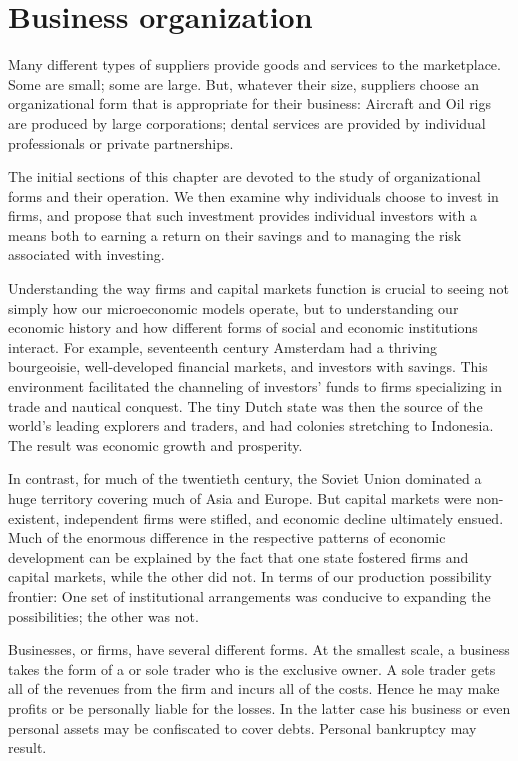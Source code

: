 \section{Business organization}\label{sec:ch7sec1}

Many different types of suppliers provide goods and services to the marketplace. Some are small; some are large. But, whatever their size, suppliers choose an organizational form that is appropriate for their business: Aircraft and Oil rigs are produced by large corporations; dental services are provided by individual professionals or private partnerships.

The initial sections of this chapter are devoted to the study of organizational forms and their operation. We then examine why individuals choose to invest in firms, and propose that such investment provides individual investors with a means both to earning a return on their savings and to managing the risk associated with investing.

Understanding the way firms and capital markets function is crucial to seeing not simply how our microeconomic models operate, but to understanding our economic history and how different forms of social and economic institutions interact. For example, seventeenth century Amsterdam had a thriving bourgeoisie, well-developed financial markets, and investors with savings. This environment facilitated the channeling of investors' funds to firms specializing in trade and nautical conquest. The tiny Dutch state was then the source of the world's leading explorers and traders, and had colonies stretching to Indonesia. The result was economic growth and prosperity.

In contrast, for much of the twentieth century, the Soviet Union dominated a huge territory covering much of Asia and Europe. But capital markets were non-existent, independent firms were stifled, and economic decline ultimately ensued. Much of the enormous difference in the respective patterns of economic development can be explained by the fact that one state fostered firms and capital markets, while the other did not. In terms of our production possibility frontier: One set of institutional arrangements was conducive to expanding the possibilities; the other was not.

Businesses, or firms, have several different forms. At the smallest scale, a business takes the form of a  or sole trader who is the exclusive owner. A sole trader gets all of the revenues from the firm and incurs all of the costs. Hence he may make profits or be personally liable for the losses. In the latter case his business or even personal assets may be confiscated to cover debts. Personal bankruptcy may result.

